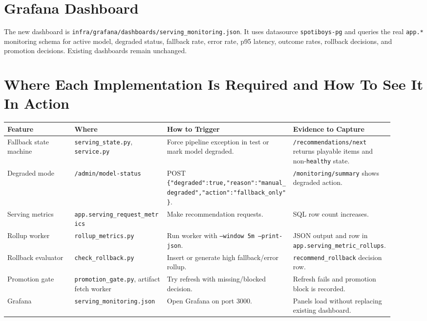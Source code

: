 \documentclass[11pt]{article}
\begin{document}
\section*{Grafana Dashboard}
The new dashboard is \texttt{infra/grafana/dashboards/serving\_monitoring.json}. It uses datasource \texttt{spotiboys-pg} and queries the real \texttt{app.*} monitoring schema for active model, degraded status, fallback rate, error rate, p95 latency, outcome rates, rollback decisions, and promotion decisions. Existing dashboards remain unchanged.

\section*{Where Each Implementation Is Required and How To See It In Action}
\begin{longtable}{p{0.16\linewidth}p{0.22\linewidth}p{0.30\linewidth}p{0.24\linewidth}}
\toprule
\textbf{Feature} & \textbf{Where} & \textbf{How to Trigger} & \textbf{Evidence to Capture} \\
\midrule
Fallback state machine & \texttt{serving\_state.py}, \texttt{service.py} & Force pipeline exception in test or mark model degraded. & \texttt{/recommendations/next} returns playable items and non-\texttt{healthy} state. \\
Degraded mode & \texttt{/admin/model-status} & POST \texttt{\{"degraded":true,"reason":"manual\_degraded","action":"fallback\_only"\}}. & \texttt{/monitoring/summary} shows degraded action. \\
Serving metrics & \texttt{app.serving\_request\_metrics} & Make recommendation requests. & SQL row count increases. \\
Rollup worker & \texttt{rollup\_metrics.py} & Run worker with \texttt{--window 5m --print-json}. & JSON output and row in \texttt{app.serving\_metric\_rollups}. \\
Rollback evaluator & \texttt{check\_rollback.py} & Insert or generate high fallback/error rollup. & \texttt{recommend\_rollback} decision row. \\
Promotion gate & \texttt{promotion\_gate.py}, artifact fetch worker & Try refresh with missing/blocked decision. & Refresh fails and promotion block is recorded. \\
Grafana & \texttt{serving\_monitoring.json} & Open Grafana on port 3000. & Panels load without replacing existing dashboard. \\
\bottomrule
\end{longtable}
\end{document}
